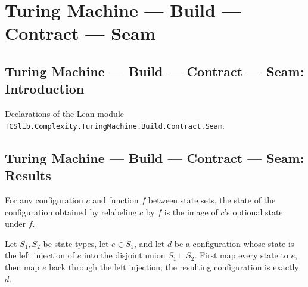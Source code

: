 \section{Turing Machine --- Build --- Contract --- Seam}
\subsection*{Turing Machine --- Build --- Contract --- Seam: Introduction}

Declarations of the Lean module \texttt{TCSlib.Complexity.TuringMachine.Build.Contract.Seam}.

\subsection*{Turing Machine --- Build --- Contract --- Seam: Results}

\begin{lemma}
\label{Turing.Contract.mapState_state}
\leanok
{}
For any configuration $c$ and function $f$ between state sets, the state of the
configuration obtained by relabeling $c$ by $f$ is the image of $c$’s optional state
under $f$.
\end{lemma}

\begin{lemma}
\label{Turing.Contract.mapState_const_inl}
\leanok
{}
Let $S_1,S_2$ be state types, let $e\in S_1$, and let $d$ be a configuration whose state
is the left injection of $e$ into the disjoint union $S_1\sqcup S_2$. First map every
state to $e$, then map $e$ back through the left injection; the resulting configuration
is exactly $d$.
\end{lemma}

